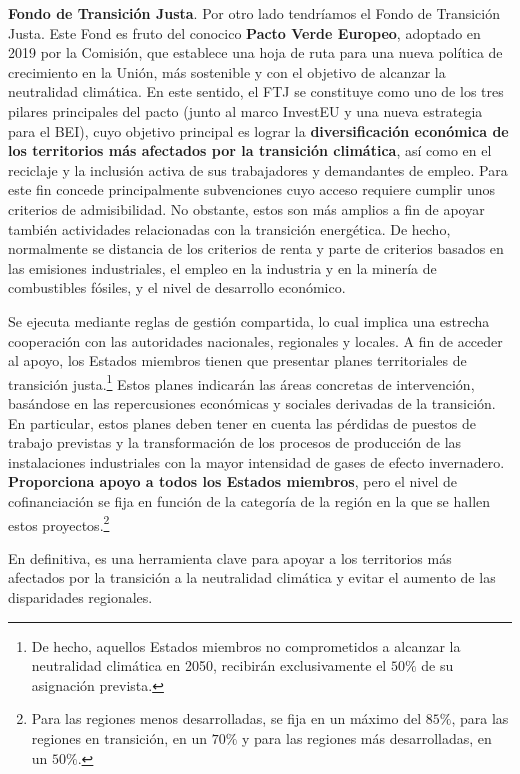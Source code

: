 \documentclass[10pt,a4paper]{article}
\begin{document}
\textbf{Fondo de Transición Justa}. Por otro lado tendríamos el Fondo de Transición Justa. Este Fond es fruto del conocico \textbf{Pacto Verde Europeo}, adoptado en 2019 por la Comisión, que establece una hoja de ruta para una nueva política de crecimiento en la Unión, más sostenible y con el objetivo de alcanzar la neutralidad climática. En este sentido, el FTJ se constituye como uno de los tres pilares principales del pacto (junto al marco InvestEU y una nueva estrategia para el BEI), cuyo objetivo principal es lograr la \textbf{diversificación económica de los territorios más afectados por la transición climática}, así como en el reciclaje y la inclusión activa de sus trabajadores y demandantes de empleo. Para este fin concede principalmente subvenciones cuyo acceso requiere cumplir unos criterios de admisibilidad. No obstante, estos son más amplios a fin de apoyar también actividades relacionadas con la transición energética. De hecho, normalmente se distancia de los criterios de renta y parte de criterios basados en las emisiones industriales, el empleo en la industria y en la minería de combustibles fósiles, y el nivel de desarrollo económico. 

Se ejecuta mediante reglas de gestión compartida, lo cual implica una estrecha cooperación con las autoridades nacionales, regionales y locales. A fin de acceder al apoyo, los Estados miembros tienen que presentar planes territoriales de transición justa.\footnote{%
    De hecho, aquellos Estados miembros no comprometidos a alcanzar la neutralidad climática en 2050, recibirán exclusivamente el $50\%$ de su asignación prevista.
} Estos planes indicarán las áreas concretas de intervención, basándose en las repercusiones económicas y sociales derivadas de la transición. En particular, estos planes deben tener en cuenta las pérdidas de puestos de trabajo previstas y la transformación de los procesos de producción de las instalaciones industriales con la mayor intensidad de gases de efecto invernadero. \textbf{Proporciona apoyo a todos los Estados miembros}, pero el nivel de cofinanciación se fija en función de la categoría de la región en la que se hallen estos proyectos.\footnote{%
    Para las regiones menos desarrolladas, se fija en un máximo del $85\%$, para las regiones en transición, en un $70\%$ y para las regiones más desarrolladas, en un $50\%$.
} 

En definitiva, es una herramienta clave para apoyar a los territorios más afectados por la transición a la neutralidad climática y evitar el aumento de las disparidades regionales. 
\end{document}
